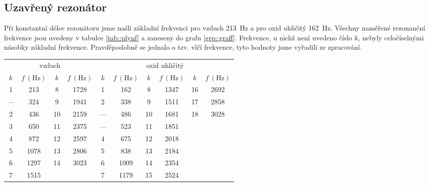 \subsection*{Uzavřený rezonátor}
Při konstantní délce rezonátoru jsme našli základní frekvenci pro vzduch \SI{213}{\Hz} a pro oxid uhličitý \SI{162}{\Hz}.
Všechny naměřené rezonanční frekvence jsou uvedeny v tabulce \ref{tab::plynf} a zaneseny do grafu \ref{grp::graff}.
Frekvence, u nichž není uvedeno číslo $k$, nebyly celočíselnými násobky základní frekvence.
Pravděpodobně se jednalo o tzv. vlčí frekvence, tyto hodnoty jsme vyřadili ze zpracování.


\begin{tabulka}[htbp]
\centering
\begin{tabular}{cc|cc||cc|cc|cc}
\multicolumn{4}{c||}{vzduch} & \multicolumn{6}{c}{oxid uhličitý} \\
$k$ & $f~(\si{\Hz})$ & $k$ & $f~(\si{\Hz})$ & $k$ & $f~(\si{\Hz})$ & $k$ & $f~(\si{\Hz})$ & $k$ & $f~(\si{\Hz})$\\ \hline
1 & 213 & 8 & 1728 & 1 & 162 & 8 & 1347 & 16 & 2692 \\
--- & 324 & 9 & 1941 & 2 & 338 & 9 & 1511 & 17 & 2858 \\
2 & 436 & 10 & 2159 & --- & 486 & 10 & 1681 & 18 & 3028 \\
3 & 650 & 11 & 2375 & --- & 523 & 11 & 1851 & & \\
4 & 872 & 12 & 2597 & 4 & 675 & 12 & 2018 & & \\
5 & 1078 & 13 & 2806 & 5 & 838 & 13 & 2184 & & \\
6 & 1297 & 14 & 3023 & 6 & 1009 & 14 & 2354 & & \\
7 & 1515 & & & 7 & 1179 & 15 & 2524 & & \\
\end{tabular}
\caption{Naměřené rezonanční frekvence při délce rezonátoru $l=\SI{800}{\mm}$}
\label{tab::plynf}
\end{tabulka}

\begin{graph}[htbp] 
\centering

\caption{Naměřená závislost rezonanční frekvence $f$ na čísle $k$ (viz rovnice \eqref{eq::f_na_k}) při délce rezonátoru \SI{800}{\mm}}
\label{grp::graff}
\end{graph}

\begin{graph}[htbp] 
\centering

\caption{Délky rezonátoru, při kterých nastala rezonance (vzduch, $f=\SI{3025}{\Hz})$ }
\label{grp::grafl}
\end{graph}

